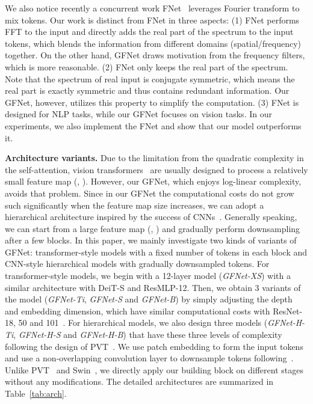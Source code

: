 \documentclass{article}
\numberwithin{equation}{section}
\newcommand{\gknet}{GFNet}
\newcommand{\paragrapha}[2][1pt]{\vspace{#1}\noindent\textbf{#2}}
\begin{document}
We also notice recently a concurrent work FNet~\cite{lee2021fnet} leverages Fourier transform to mix tokens. Our work is distinct from FNet in three aspects: (1) FNet performs FFT to the input and directly adds the real part of the spectrum to the input tokens, which blends the information from different domains (spatial/frequency) together. On the other hand, \gknet{} draws motivation from the frequency filters, which is more reasonable. (2) FNet only keeps the real part of the spectrum. Note that the spectrum of real input is conjugate symmetric, which means the real part is exactly symmetric and thus contains redundant information. Our \gknet{}, however, utilizes this property to simplify the computation. (3) FNet is designed for NLP tasks, while our \gknet{} focuses on vision tasks. In our experiments, we also implement the FNet and show that our model outperforms it.

\paragrapha{Architecture variants.} Due to the limitation from the quadratic complexity in the self-attention, vision transformers~\cite{dosovitskiy2020vit,touvron2020deit} are usually designed to process a relatively small feature map (\eg, ). However, our \gknet{}, which enjoys log-linear complexity, avoids that problem. Since in our \gknet{} the computational costs do not grow such significantly when the feature map size increases, we can adopt a hierarchical architecture inspired by the success of CNNs~\cite{krizhevsky2012alex,he2016deep}. Generally speaking, we can start from a large feature map (\eg, ) and gradually perform downsampling after a few blocks. In this paper, we mainly investigate two kinds of variants of \gknet{}: transformer-style models with a fixed number of tokens in each block and CNN-style hierarchical models with gradually downsampled tokens. For transformer-style models, we begin with a 12-layer model (\emph{GFNet-XS}) with a similar architecture with DeiT-S and ResMLP-12. Then, we obtain 3 variants of the model (\emph{GFNet-Ti}, \emph{GFNet-S} and \emph{GFNet-B}) by simply adjusting the depth and embedding dimension, which have similar computational costs with ResNet-18, 50 and 101~\cite{he2016deep}. For hierarchical models, we also design three models  (\emph{GFNet-H-Ti}, \emph{GFNet-H-S} and \emph{GFNet-H-B}) that have these three levels of complexity following the design of PVT~\cite{wang2021pyramid}. We use  patch embedding to form the input tokens and use a non-overlapping convolution layer to downsample tokens  following~\cite{wang2021pyramid,liu2021swin}.  Unlike PVT~\cite{wang2021pyramid} and Swin~\cite{liu2021swin}, we directly apply our building block on different stages without any modifications.  The detailed architectures are summarized in Table~\ref{tab:arch}.
\end{document}
